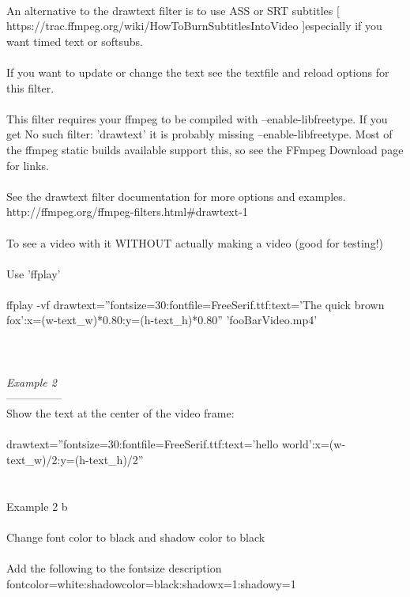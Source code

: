 \documentclass[10pt,a4paper]{article}
\begin{document}
{{{{{{{{{{{{{{\\
An alternative to the drawtext filter is to use ASS or SRT subtitles }[ https://trac.ffmpeg.org/wiki/HowToBurnSubtitlesIntoVideo ]{\Large  especially if you want timed text or softsubs.\\
\\
If you want to update or change the text see the textfile and reload options for this filter.\\
\\
This filter requires your ffmpeg to be compiled with --enable-libfreetype. If you get No such filter: 'drawtext' it is probably missing --enable-libfreetype. Most of the ffmpeg static builds available support this, so see the FFmpeg Download page for links.\\
\\
See the drawtext filter documentation for more options and examples.\\
}http://ffmpeg.org/ffmpeg-filters.html\#drawtext-1{\Large \\
\\
To see a video with it WITHOUT actually making a video (good for testing!)\\
\\
Use 'ffplay'\\
\\
ffplay -vf drawtext=''fontsize=30:fontfile=FreeSerif.ttf:text='The quick brown fox':x=(w-text\_w)*0.80:y=(h-text\_h)*0.80'' 'fooBarVideo.mp4'\\
\\
\\
\\
\textit{Example 2}}{\Large \\
---------------\\
Show the text at the center of the video frame: \\
\\
	drawtext=''fontsize=30:fontfile=FreeSerif.ttf:text='hello world':x=(w-text\_w)/2:y=(h-text\_h)/2''\\
\\
\\
Example 2 b\\
\\
Change font color to black and shadow color to black\\
\\
Add the following to the fontsize description \\
	fontcolor=white:shadowcolor=black:shadowx=1:shadowy=1\\
\\
}}}}}}}}}}}}}}
\end{document}

